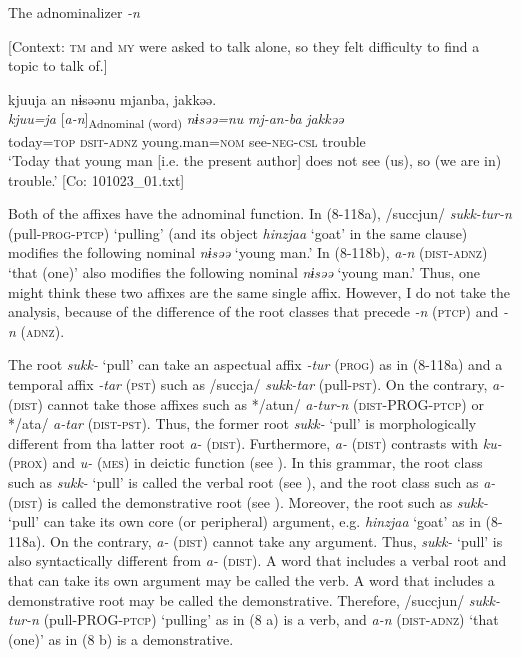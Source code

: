 \ex The adnominalizer \textit{-n}

  [Context: \textsc{tm} and \textsc{my} were asked to talk alone, so they felt difficulty to find a topic to talk of.]

  {\TM}
\glll   kjuuja  an  nɨsəənu  mjanba,  jakkəə.\\
\textit{kjuu=ja}  [\textit{a-n}]\textsubscript{Adnominal (word)}  \textit{nɨsəə=nu}  \textit{mj-an-ba}  \textit{jakkəə}\\
    today=\textsc{top}  \textsc{dsit}-\textsc{adnz}  young.man=\textsc{nom}  see-\textsc{neg}-\textsc{csl}  trouble\\
\glt ‘Today that young man [i.e. the present author] does not see (us), so (we are in) trouble.’   [Co: 101023\_01.txt]
\z
\z

Both of the affixes have the adnominal function. In (8\nobreakdash-118a), /succjun/ \textit{sukk-tur-n} (pull-\textsc{prog}-\textsc{ptcp}) ‘pulling’ (and its object \textit{hinzjaa} ‘goat’ in the same clause) modifies the following nominal \textit{nɨsəə} ‘young man.’ In (8\nobreakdash-118b), \textit{a-n} (\textsc{dist}-\textsc{adnz}) ‘that (one)’ also modifies the following nominal \textit{nɨsəə} ‘young man.’ Thus, one might think these two affixes are the same single affix. However, I do not take the analysis, because of the difference of the root classes that precede \textit{-n} (\textsc{ptcp}) and \textit{-n} (\textsc{adnz}).

The root \textit{sukk-} ‘pull’ can take an aspectual affix \textit{-tur} (\textsc{prog}) as in (8\nobreakdash-118a) and a temporal affix \textit{-tar} (\textsc{pst}) such as /succja/ \textit{sukk-tar} (pull-\textsc{pst}). On the contrary, \textit{a-} (\textsc{dist}) cannot take those affixes such as */atun/ \textit{a-tur-n} (\textsc{dist}-PROG-\textsc{ptcp}) or */ata/ \textit{a-tar} (\textsc{dist}-\textsc{pst}). Thus, the former root \textit{sukk-} ‘pull’ is morphologically different from tha latter root \textit{a-} (\textsc{dist}). Furthermore, \textit{a-} (\textsc{dist}) contrasts with \textit{ku-} (\textsc{prox}) and \textit{u-} (\textsc{mes}) in deictic function (see ). In this grammar, the root class such as \textit{sukk-} ‘pull’ is called the verbal root (see ), and the root class such as \textit{a-} (\textsc{dist}) is called the demonstrative root (see ). Moreover, the root such as \textit{sukk-} ‘pull’ can take its own core (or peripheral) argument, e.g. \textit{hinzjaa} ‘goat’ as in (8\nobreakdash-118a). On the contrary, \textit{a-} (\textsc{dist}) cannot take any argument. Thus, \textit{sukk-} ‘pull’ is also syntactically different from \textit{a-} (\textsc{dist}). A word that includes a verbal root and that can take its own argument may be called the verb. A word that includes a demonstrative root may be called the demonstrative. Therefore, /succjun/ \textit{sukk-tur-n} (pull-PROG-\textsc{ptcp}) ‘pulling’ as in (8 a) is a verb, and \textit{a-n} (\textsc{dist}-\textsc{adnz}) ‘that (one)’ as in (8 b) is a demonstrative.

